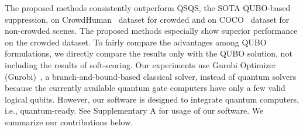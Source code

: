 The proposed methods consistently outperform QSQS, the SOTA QUBO-based suppression, on CrowdHuman~\cite{shao2018crowdhuman} dataset for crowded and on COCO~\cite{lin2015microsoft} dataset for non-crowded scenes.
The proposed methods especially show superior performance on the crowded dataset.
To fairly compare the advantages among QUBO formulations, we directly compare the results only with the QUBO solution, not including the results of soft-scoring. 
Our experiments use Gurobi Optimizer (Gurobi)~\cite{gurobi}, a branch-and-bound-based classical solver, instead of quantum solvers because the currently available quantum gate computers have only a few valid logical qubits.
However, our software is designed to integrate quantum computers, i.e., quantum-ready. See Supplementary A for usage of our software.
We summarize our contributions below.
